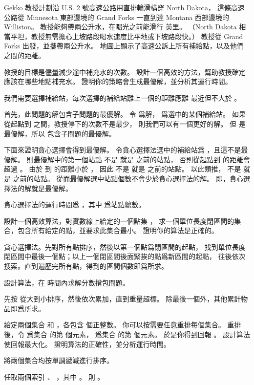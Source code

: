 \startEXERCISE
Gekko 教授計劃沿 U.S. 2 號高速公路用直排輪滑橫穿 North Dakota，
這條高速公路從 Minnesota 東部邊境的 Grand Forks 一直到達 Montana 西部邊境的 Williston。
教授能夠帶兩公升水，在喝光之前能滑行  英里。
（North Dakota 相當平坦，教授無需擔心上坡路段喝水速度比平地或下坡路段快。）
教授從 Grand Forks 出發，並攜帶兩公升水。
地圖上顯示了高速公訴上所有補給點，以及他們之間的距離。

教授的目標是儘量減少途中補充水的次數。
設計一個高效的方法，幫助教授確定應該在哪些地點補充水。
證明你的策略會生成最優解，並分析其運行時間。
\stopEXERCISE

\startANSWER
我們需要選擇補給站，每次選擇的補給站離上一個的距離應離  最近但不大於 。

首先，此問題的解包含子問題的最優解。
令  爲解，  爲選中的某個補給站。
如果從起點到  之間，教授停下的次數不是最少，
則我們可以有一個更好的解。
但  是最優解，所以  包含子問題的最優解。

下面來證明貪心選擇會得到最優解。
令貪心選擇法選中的補給站爲 ，且這不是最優解。
則最優解中的第一個站點  不是  就是  之前的站點，
否則從起點到  的距離會超過 。
由於  到  的距離小於 ，
因此  不是  就是  之前的站點。
以此類推，  不是  就是  之前的站點。
從而最優解選中站點個數不會少於貪心選擇法的解。
即，貪心選擇法的解就是最優解。

貪心選擇法的運行時間爲 ，其中  爲站點總數。
\stopANSWER

\startEXERCISE
設計一個高效算法，對實數線上給定的一個點集 ，
求一個單位長度閉區間的集合，包含所有給定的點，並要求此集合最小。
證明你的算法是正確的。
\stopEXERCISE

\startANSWER
貪心選擇法。先對所有點排序，然後以第一個點爲閉區間的起點，
找到單位長度閉區間中最後一個點；以上一個閉區間後面緊挨的點爲新區間的起點，
往後依次搜索。直到遍歷完所有點，得到的區間個數即爲所求。
\stopANSWER

\startEXERCISE\DIFFICULT
設計算法，在  時間內求解分數揹包問題。
\stopEXERCISE

\startANSWER
先按  從大到小排序，然後依次累加，直到重量超標。
除最後一個外，其他累計物品即爲所求。
\stopANSWER

\startEXERCISE
給定兩個集合  和 ，各包含  個正整數。
你可以按需要任意重排每個集合。
重排後，令  爲集合  的第  個元素，
  爲集合  的第  個元素。
於是你得到回報 。
設計算法使回報最大化。
證明算法的正確性，並分析運行時間。
\stopEXERCISE

\startANSWER
將兩個集合均按單調遞減進行排序。

任取兩個索引 、 ，其中 。
則 。
\stopANSWER

\stopsection
